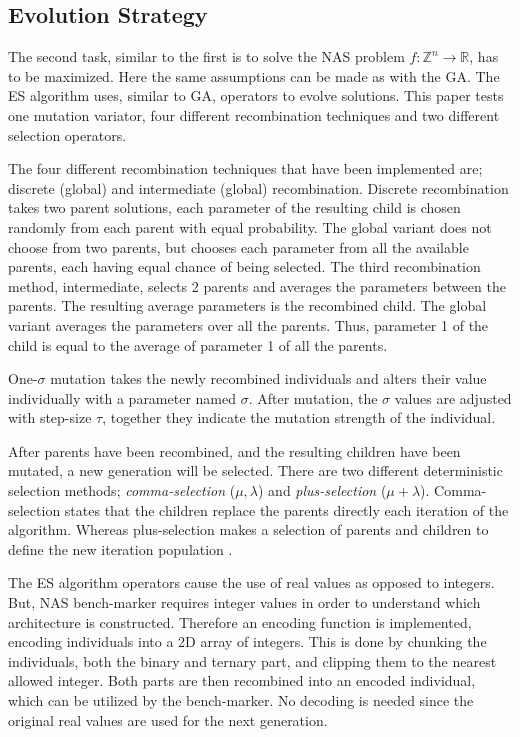 \documentclass{article}
\begin{document}

\subsection{Evolution Strategy}
\label{sec:ES}

The second task, similar to the first is to solve the NAS problem $f: \mathbb{Z}^n \rightarrow \mathbb{R}$, has to be maximized. 
Here the same assumptions can be made as with the GA. 
The ES algorithm uses, similar to GA, operators to evolve solutions.
This paper tests one mutation variator, four different recombination techniques and two different selection operators.

The four different recombination techniques that have been implemented are; discrete (global) and intermediate (global) recombination. Discrete recombination takes two parent solutions, each parameter of the resulting child is chosen randomly from each parent with equal probability. The global variant does not choose from two parents, but chooses each parameter from all the available parents, each having equal chance of being selected. The third recombination method, intermediate, selects 2 parents and averages the parameters between the parents. The resulting average parameters is the recombined child. The global variant averages the parameters over all the parents. Thus, parameter 1 of the child is equal to the average of parameter 1 of all the parents. 

One-$\sigma$ mutation takes the newly recombined individuals and alters their value individually with a parameter named $\sigma$.
After mutation, the $\sigma$ values are adjusted with step-size $\tau$, together they indicate the mutation strength of the individual.

After parents have been recombined, and the resulting children have been mutated, a new generation will be selected. There are two different deterministic selection methods; \textit{comma-selection} ($\mu , \lambda$) and \textit{plus-selection} ($\mu + \lambda$). Comma-selection states that the children replace the parents directly each iteration of the algorithm. Whereas plus-selection makes a selection of parents and children to define the new iteration population \cite{ES_3} \cite{ES_1}. 

The ES algorithm operators cause the use of real values as opposed to integers. 
But, NAS bench-marker requires integer values in order to understand which architecture is constructed. 
Therefore an encoding function is implemented, encoding individuals into a 2D array of integers. 
This is done by chunking the individuals, both the binary and ternary part, and clipping them to the nearest allowed integer. Both parts are then recombined into an encoded individual, which can be utilized by the bench-marker. No decoding is needed since the original real values are used for the next generation. 
\end{document}
